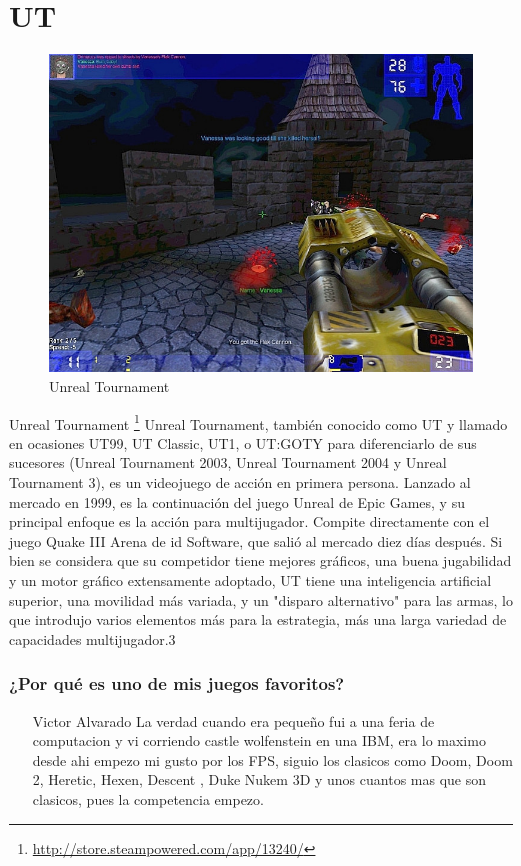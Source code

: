 \section{UT}

\begin{figure}[htbp]
\begin{center}
\includegraphics[width=.60\textwidth]{./imagenes/ut.jpg}
\caption{Unreal Tournament}
\label{Unreal Tournament}
\end{center}
\end{figure}
Unreal Tournament \footnote{\url{http://store.steampowered.com/app/13240/}} Unreal Tournament, también conocido como UT y llamado en ocasiones UT99, UT Classic, UT1, o UT:GOTY para diferenciarlo de sus sucesores (Unreal Tournament 2003, Unreal Tournament 2004 y Unreal Tournament 3), es un videojuego de acción en primera persona. 
Lanzado al mercado en 1999, es la continuación del juego Unreal de Epic Games, y su principal enfoque es la acción para multijugador. Compite directamente con el juego Quake III Arena de id Software, que salió al mercado diez días después. Si bien se considera que su competidor tiene mejores gráficos, una buena jugabilidad y un motor gráfico extensamente adoptado, UT tiene una inteligencia artificial superior, una movilidad más variada, y un "disparo alternativo" para las armas, lo que introdujo varios elementos más para la estrategia, más una larga variedad de capacidades multijugador.3

\subsubsection{¿Por qué es uno de mis juegos favoritos?}
\begin{itemize}
\item[Victor Alvarado] La verdad  cuando era pequeño fui a una feria de computacion y vi corriendo castle wolfenstein en una IBM, era lo maximo desde ahi empezo mi gusto por los FPS, siguio los  clasicos como Doom, Doom 2, Heretic, Hexen, Descent , Duke Nukem 3D y unos cuantos mas que son clasicos, pues la competencia empezo.
\end{itemize}